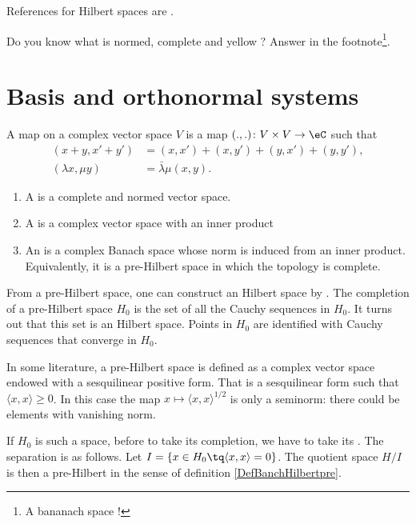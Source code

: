 
References for Hilbert spaces are \cite{Wassermann,Landsman}.

Do you know what is normed, complete and yellow ? Answer in the footnote\footnote{A bananach space !}.

\section{Basis and orthonormal systems}

A  map on a complex vector space $V$ is a map $(.,.)\colon V\times V\to \eC$ such that
\[ 
\begin{split}
(x+y,x'+y')&=(x,x')+(x,y')+(y,x')+(y,y'),\\
(\lambda x,\mu y)&=\bar\lambda\mu(x,y).
\end{split}  
\]

\begin{definition}		\label{DefBanchHilbertpre}
	\begin{enumerate}
		\item
			A  is a complete and normed vector space.
		\item
			A  is a complex vector space with an inner product
		\item
			An  is a complex Banach space whose norm is induced from an inner product. Equivalently, it is a pre-Hilbert space in which the topology is complete.
	\end{enumerate}
\end{definition}

From a pre-Hilbert space, one can construct an Hilbert space by . The completion of a pre-Hilbert space $H_0$ is the set of all the Cauchy sequences in $H_0$. It turns out that this set is an Hilbert space. Points in $H_0$ are identified with Cauchy sequences that converge in $H_0$.

\begin{remark}
	In some literature\cite{AlgOpGirard}, a pre-Hilbert space is defined as a complex vector space endowed with a sesquilinear positive form. That is a sesquilinear form such that $\langle x, x\rangle \geq 0$. In this case the map $x\mapsto\langle x, x\rangle ^{1/2}$ is only a seminorm: there could be elements with vanishing norm.

	If $H_0$ is such a space, before to take its completion, we have to take its . The separation is as follows. Let $I=\{ x\in H_0\tq \langle x, x\rangle =0 \}$. The quotient space $H/I$ is then a pre-Hilbert in the sense of definition \ref{DefBanchHilbertpre}.
\end{remark}

